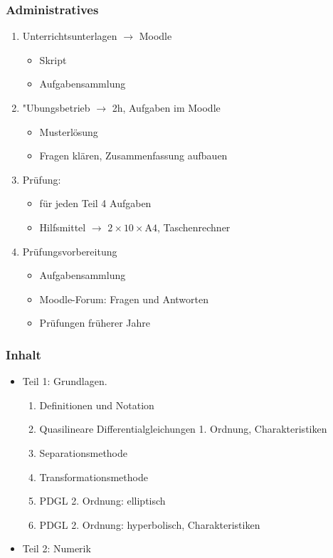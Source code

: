 \begin{frame}
\frametitle{Administratives}
\begin{enumerate}
\item Unterrichtsunterlagen $\to$ Moodle
\begin{itemize}
\item Skript
\item Aufgabensammlung
\end{itemize}
\item "Ubungsbetrieb $\to$ 2h, Aufgaben im Moodle
\begin{itemize}
\item Musterlösung
\item Fragen klären, Zusammenfassung aufbauen
\end{itemize}
\item Prüfung:
\begin{itemize}
\item für jeden Teil 4 Aufgaben
\item Hilfsmittel $\to$ $2\times 10\times \text{A4}$, Taschenrechner
\end{itemize}
\item Prüfungsvorbereitung
\begin{itemize}
\item Aufgabensammlung
\item Moodle-Forum: Fragen und Antworten
\item Prüfungen früherer Jahre
\end{itemize}
\end{enumerate}
\end{frame}

\begin{frame}
\frametitle{Inhalt}
\begin{itemize}[<+->]
\item Teil 1: Grundlagen.
\begin{enumerate}[<+->]
\item Definitionen und Notation
\item Quasilineare Differentialgleichungen 1. Ordnung, Charakteristiken
\item Separationsmethode
\item Transformationsmethode
\item PDGL 2. Ordnung: elliptisch
\item PDGL 2. Ordnung: hyperbolisch, Charakteristiken
\end{enumerate}
\item Teil 2: Numerik
\end{itemize}
\end{frame}

